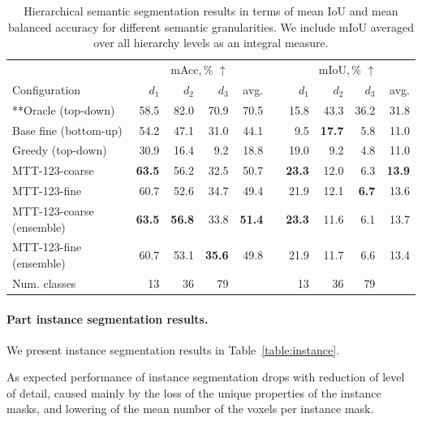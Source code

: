 \begin{table}[!h]

\caption{Hierarchical semantic segmentation results in terms of mean IoU and mean balanced accuracy for different semantic granularities. We include mIoU averaged over all hierarchy levels as an integral measure.}
\centering
\begin{tabular}{l rrrr r rrrr}
\toprule
  & \multicolumn{4}{c}{mAcc,\,\% $\uparrow$} 
 && \multicolumn{4}{c}{mIoU,\,\% $\uparrow$} \\
\cmidrule{2-5}
\cmidrule{7-10}
Configuration           & $d_1$ & $d_2$ & $d_3$ &  avg. && $d_1$ & $d_2$ & $d_3$ & avg. \\
\midrule
**Oracle (top-down)        &  58.5 &  82.0 &  70.9 &  70.5 &&   15.8 &  43.3 &  36.2& 31.8 \\
\midrule
Base fine (bottom-up)    &  54.2 &  47.1 &  31.0 &  44.1 &&   9.5 &  \textbf{17.7} &   5.8 & 11.0 \\
Greedy (top-down)        &  30.9 &  16.4 &   9.2 &  18.8 &&  19.0 &   9.2 &   4.8 & 11.0 \\
MTT-123-coarse           &  \textbf{63.5} &  56.2 &  32.5 &  50.7 &&  \textbf{23.3} &  12.0 &   6.3 & \textbf{13.9} \\
MTT-123-fine             &  60.7 &  52.6 &  34.7 &  49.4 &&  21.9 &  12.1 &  \textbf{6.7} & 13.6 \\
MTT-123-coarse (ensemble)&  \textbf{63.5} &	\textbf{56.8} &	33.8 & \textbf{51.4} &&   \textbf{23.3} &  11.6 &   6.1 & 13.7 \\
MTT-123-fine (ensemble)  & 60.7	 & 53.1 &	\textbf{35.6} & 49.8 &&   21.9 &  11.7 &   6.6 & 13.4 \\
\midrule
Num. classes            &    13 &    36 &    79 &       &&    13 &    36 &    79 &      \\
\bottomrule
\end{tabular}
\label{tab:hierarchical_seg}
\end{table}


\paragraph{Part instance segmentation results. }
\label{results:instance}
We present instance segmentation results in Table~\ref{table:instance}.

As expected performance of instance segmentation drops with reduction of level of detail, caused mainly by the loss of the unique properties of the instance masks, and lowering of the mean number of the voxels per instance mask.

